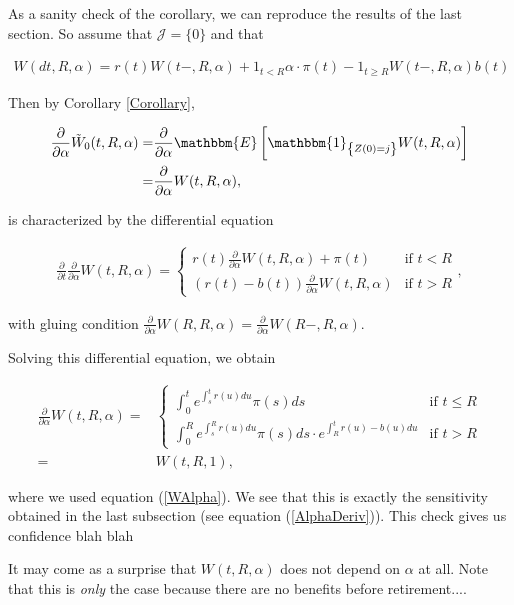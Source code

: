 \documentclass{article}
\newcommand{\1}[1]{\mathbbm{1}_{\left\lbrace #1 \right\rbrace}}
\newcommand{\expec}[1][def]{\mathbbm{E} \left[ #1 \right]}
\theoremstyle{break}
\theoremstyle{remark}
\numberwithin{equation}{section}
\begin{document}
\begin{example}
	As a sanity check of the corollary, we can reproduce the results of the last section. So assume that $\mathcal{J} = \{ 0 \}$ and that
	
	\begin{align*}
		W(dt,R,\alpha) = r(t) W(t-,R,\alpha) + 1_{t<R} \alpha \cdot \pi(t) - 1_{t \geq R} W(t-,R,\alpha) b(t)
	\end{align*}

	Then by Corollary \ref{Corollary},
	
	\begin{align*}
		\frac{\partial}{\partial \alpha} \tilde{W}_0(t,R,\alpha) =&  \frac{\partial}{\partial \alpha} \expec[\1{Z(0)=j} W(t,R,\alpha)] \\
		=&\frac{\partial}{\partial \alpha} W(t,R,\alpha),
	\end{align*}

	is characterized by the differential equation
	
	\begin{align*}
		\frac{\partial}{\partial t} \frac{\partial}{\partial \alpha} W(t,R,\alpha) = \left\{
		\begin{array}{ll}
			r(t) \frac{\partial}{\partial \alpha} W(t,R,\alpha) + \pi(t) & \mbox{if } t < R \\
			\left( r(t) - b(t) \right) \frac{\partial}{\partial \alpha} W(t,R,\alpha) & \mbox{if } t > R
		\end{array}
		\right.,
	\end{align*}

	with gluing condition $\frac{\partial}{\partial \alpha} W(R,R,\alpha) = \frac{\partial}{\partial \alpha} W(R-,R,\alpha)$.
	
	Solving this differential equation, we obtain
	
	\begin{align*}
	\frac{\partial}{\partial \alpha} W(t,R,\alpha) =& \left\{
		\begin{array}{ll}
			\int_0^t e^{\int_s^t r(u) du} \pi(s) ds & \mbox{if } t \leq R \\
			\int_0^R e^{\int_s^R r(u) du} \pi(s) ds \cdot e^{\int_R^t r(u) - b(u) du} & \mbox{if } t > R
		\end{array}
		\right. \\
		=& W(t,R,1),
	\end{align*}

	where we used equation (\ref{WAlpha}). We see that this is exactly the sensitivity obtained in the last subsection (see equation (\ref{AlphaDeriv})). This check gives us confidence blah blah
	
	It may come as a surprise that $W(t,R,\alpha)$ does not depend on $\alpha$ at all. Note that this is \textit{only} the case because there are no benefits before retirement....
\end{example}
\end{document}
